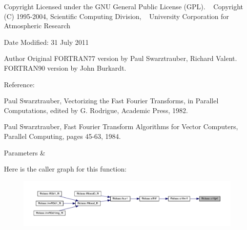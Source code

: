 \begin{DoxyCopyright}{Copyright}
Licensed under the G\+NU General Public License (G\+PL). ~\newline
 Copyright (C) 1995-\/2004, Scientific Computing Division, ~\newline
 University Corporation for Atmospheric Research 
\end{DoxyCopyright}
\begin{DoxyDate}{Date}
Modified\+: 31 July 2011 
\end{DoxyDate}
\begin{DoxyAuthor}{Author}
Original F\+O\+R\+T\+R\+A\+N77 version by Paul Swarztrauber, Richard Valent. ~\newline
 F\+O\+R\+T\+R\+A\+N90 version by John Burkardt.
\end{DoxyAuthor}
\begin{DoxyVerb}  Reference:

    Paul Swarztrauber,
    Vectorizing the Fast Fourier Transforms,
    in Parallel Computations,
    edited by G. Rodrigue,
    Academic Press, 1982.

    Paul Swarztrauber,
    Fast Fourier Transform Algorithms for Vector Computers,
    Parallel Computing, pages 45-63, 1984.\end{DoxyVerb}
 
\begin{DoxyParams}{Parameters}
{\em } & \\
\hline
\end{DoxyParams}
Here is the caller graph for this function\+:\nopagebreak
\begin{figure}[H]
\begin{center}
\leavevmode
\includegraphics[width=350pt]{namespacefftclass_ac6d6749fee5ff8e325bdf80834fa5337_icgraph}
\end{center}
\end{figure}
\mbox{\label{namespacefftclass_a2f5368919279e1986ee34764caa05fe0}} 
